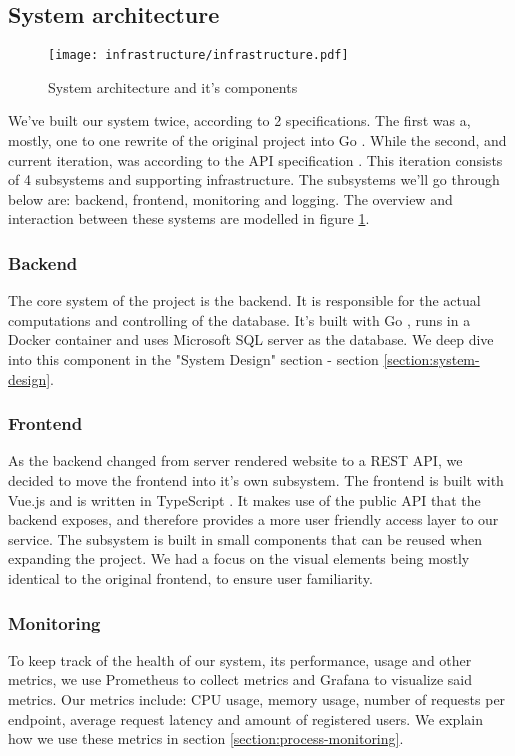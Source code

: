 \subsection{System architecture}
\begin{figure}[h]
    \centering
    \texttt{[image: infrastructure/infrastructure.pdf]}
    \caption{System architecture and it's components}
    \label{fig:architecture}
\end{figure}

We've built our system twice, according to 2 specifications. The first was a, mostly, one to one rewrite of the original project into Go \cite{tool:go}.
While the second, and current iteration, was according to the API specification \cite{spec:api}. 
This iteration consists of 4 subsystems and supporting infrastructure. The subsystems we'll go through below are: backend, frontend, monitoring and logging.
The overview and interaction between these systems are modelled in figure \ref{fig:architecture}.

\subsubsection{Backend}
The core system of the project is the backend. It is responsible for the actual computations and controlling of the database.
It's built with Go \cite{tool:go}, runs in a Docker container and uses Microsoft SQL server \cite{tool:microsoft-sql-server} as the database. We deep dive into this component in the "System Design" section - section \ref{section:system-design}.

\subsubsection{Frontend}
As the backend changed from server rendered website to a REST API, we decided to move the frontend into it's own subsystem.
The frontend is built with Vue.js \cite{tool:vue} and is written in TypeScript \cite{tool:typescript}.
It makes use of the public API that the backend exposes, and therefore provides a more user friendly access layer to our service.
The subsystem is built in small components that can be reused when expanding the project. We had a focus on the visual elements being mostly identical to the original frontend, to ensure user familiarity.

\subsubsection{Monitoring}
To keep track of the health of our system, its performance, usage and other metrics, we use Prometheus \cite{tool:prometheus} to collect metrics and Grafana \cite{tool:grafana} to visualize said metrics.
Our metrics include: CPU usage, memory usage, number of requests per endpoint, average request latency and amount of registered users.
We explain how we use these metrics in section \ref{section:process-monitoring}.

